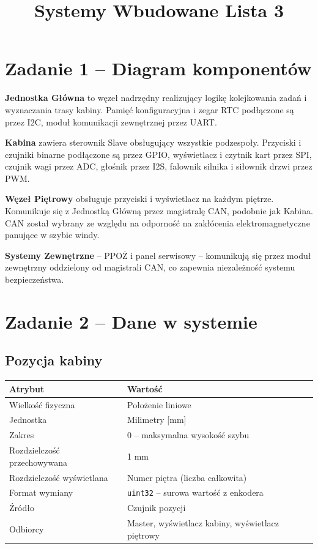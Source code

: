 \documentclass[12pt,a4paper]{article}
\title{\textbf{Systemy Wbudowane Lista 3}}
\begin{document}
\maketitle

\section{Zadanie 1 -- Diagram komponentów}

\textbf{Jednostka Główna} to węzeł nadrzędny realizujący logikę kolejkowania zadań i wyznaczania trasy kabiny. Pamięć konfiguracyjna i zegar RTC podłączone są przez I2C, moduł komunikacji zewnętrznej przez UART.

\textbf{Kabina} zawiera sterownik Slave obsługujący wszystkie podzespoły. Przyciski i czujniki binarne podłączone są przez GPIO, wyświetlacz i czytnik kart przez SPI, czujnik wagi przez ADC, głośnik przez I2S, falownik silnika i siłownik drzwi przez PWM.

\textbf{Węzeł Piętrowy} obsługuje przyciski i wyświetlacz na każdym piętrze. Komunikuje się z Jednostką Główną przez magistralę CAN, podobnie jak Kabina. CAN został wybrany ze względu na odporność na zakłócenia elektromagnetyczne panujące w szybie windy.

\textbf{Systemy Zewnętrzne} -- PPOŻ i panel serwisowy -- komunikują się przez moduł zewnętrzny oddzielony od magistrali CAN, co zapewnia niezależność systemu bezpieczeństwa.

\section{Zadanie 2 -- Dane w systemie}

\subsection{Pozycja kabiny}

\begin{tabularx}{\textwidth}{lX}
\toprule
\textbf{Atrybut} & \textbf{Wartość} \\
\midrule
Wielkość fizyczna & Położenie liniowe \\
Jednostka & Milimetry [mm] \\
Zakres & 0 -- maksymalna wysokość szybu \\
Rozdzielczość przechowywana & 1 mm \\
Rozdzielczość wyświetlana & Numer piętra (liczba całkowita) \\
Format wymiany & \texttt{uint32} -- surowa wartość z enkodera \\
Źródło & Czujnik pozycji \\
Odbiorcy & Master, wyświetlacz kabiny, wyświetlacz piętrowy \\
\bottomrule
\end{tabularx}
\end{document}
